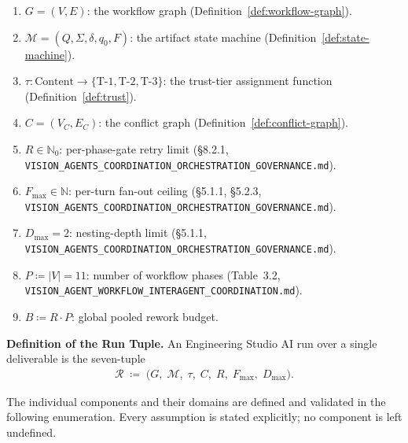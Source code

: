 \documentclass[12pt]{article}
\theoremstyle{definition}
\newcommand{\code}[1]{\texttt{#1}}
\newcommand{\VisionGov}{\code{VISION\_AGENTS\_\allowbreak COORDINATION\_\allowbreak ORCHESTRATION\_\allowbreak GOVERNANCE.md}}
\newcommand{\VisionFlow}{\code{VISION\_AGENT\_\allowbreak WORKFLOW\_\allowbreak INTERAGENT\_\allowbreak COORDINATION.md}}
\begin{document}
\begin{enumerate}
  \item $G = (V, E)$: the workflow graph
        (Definition~\ref{def:workflow-graph}).
  \item $\mathcal{M} = (Q, \Sigma, \delta, q_0, F)$: the artifact
        state machine (Definition~\ref{def:state-machine}).
  \item $\tau : \mathrm{Content} \to
        \{\mathrm{T\text{-}1},\mathrm{T\text{-}2},\mathrm{T\text{-}3}\}$:
        the trust-tier assignment function
        (Definition~\ref{def:trust}).
  \item $C = (V_C, E_C)$: the conflict graph
        (Definition~\ref{def:conflict-graph}).
  \item $R \in \mathbb{N}_0$: per-phase-gate retry limit
        (\S8.2.1, \VisionGov{}).
  \item $F_{\max} \in \mathbb{N}$: per-turn fan-out ceiling
        (\S5.1.1, \S5.2.3, \VisionGov{}).
  \item $D_{\max} = 2$: nesting-depth limit
        (\S5.1.1, \VisionGov{}).
  \item $P \coloneqq |V| = 11$: number of workflow phases
        (Table~3.2, \VisionFlow{}).
  \item $B \coloneqq R \cdot P$: global pooled rework budget.
\end{enumerate}

\medskip
\noindent\textbf{Definition of the Run Tuple.}
An Engineering Studio AI run over a single deliverable is the
seven-tuple
\begin{align}
  \label{eq:run-tuple}
  \mathcal{R}
  \;\coloneqq\;
  \bigl(
    G,\;
    \mathcal{M},\;
    \tau,\;
    C,\;
    R,\;
    F_{\max},\;
    D_{\max}
  \bigr).
\end{align}

\noindent The individual components and their domains are defined
and validated in the following enumeration.  Every assumption is
stated explicitly; no component is left undefined.
\end{document}
